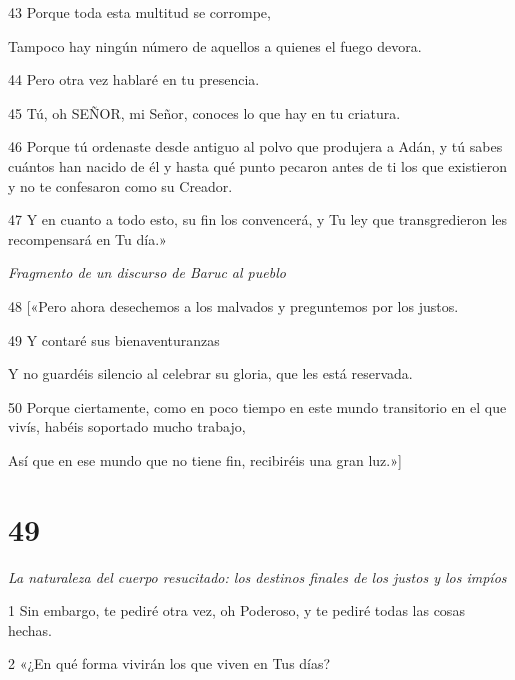 \par 43 Porque toda esta multitud se corrompe,

\par Tampoco hay ningún número de aquellos a quienes el fuego devora.

\par 44 Pero otra vez hablaré en tu presencia.

\par 45 Tú, oh SEÑOR, mi Señor, conoces lo que hay en tu criatura.

\par 46 Porque tú ordenaste desde antiguo al polvo que produjera a Adán, y tú sabes cuántos han nacido de él y hasta qué punto pecaron antes de ti los que existieron y no te confesaron como su Creador.

\par 47 Y en cuanto a todo esto, su fin los convencerá, y Tu ley que transgredieron les recompensará en Tu día.»

\par \textit{Fragmento de un discurso de Baruc al pueblo}

\par 48 [«Pero ahora desechemos a los malvados y preguntemos por los justos.

\par 49 Y contaré sus bienaventuranzas

\par Y no guardéis silencio al celebrar su gloria, que les está reservada.

\par 50 Porque ciertamente, como en poco tiempo en este mundo transitorio en el que vivís, habéis soportado mucho trabajo,

\par Así que en ese mundo que no tiene fin, recibiréis una gran luz.»]

\chapter{49}

\par \textit{La naturaleza del cuerpo resucitado: los destinos finales de los justos y los impíos}

\par 1 Sin embargo, te pediré otra vez, oh Poderoso, y te pediré todas las cosas hechas.

\par 2 «¿En qué forma vivirán los que viven en Tus días?

